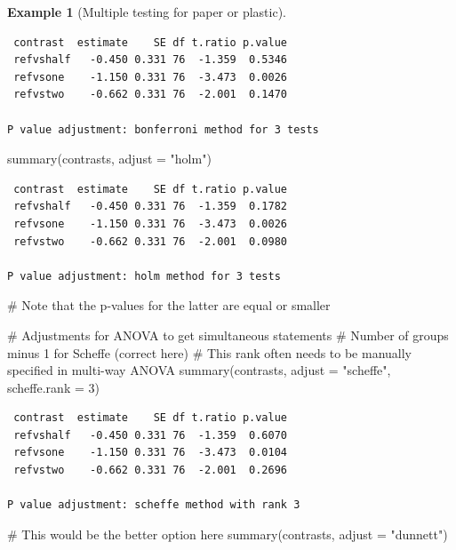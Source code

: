 \documentclass[
  11pt,
  letterpaper,
]{scrbook}
\newenvironment{Shaded}{\begin{snugshade}}{\end{snugshade}}
\newcommand{\AttributeTok}[1]{\textcolor[rgb]{0.40,0.45,0.13}{#1}}
\newcommand{\CommentTok}[1]{\textcolor[rgb]{0.37,0.37,0.37}{#1}}
\newcommand{\DecValTok}[1]{\textcolor[rgb]{0.68,0.00,0.00}{#1}}
\newcommand{\FunctionTok}[1]{\textcolor[rgb]{0.28,0.35,0.67}{#1}}
\newcommand{\NormalTok}[1]{\textcolor[rgb]{0.00,0.23,0.31}{#1}}
\newcommand{\StringTok}[1]{\textcolor[rgb]{0.13,0.47,0.30}{#1}}
\theoremstyle{definition}
\newtheorem{example}{Example}[chapter]
\theoremstyle{remark}
\begin{document}
\begin{example}[Multiple testing for paper or
plastic]
\begin{verbatim}
 contrast  estimate    SE df t.ratio p.value
 refvshalf   -0.450 0.331 76  -1.359  0.5346
 refvsone    -1.150 0.331 76  -3.473  0.0026
 refvstwo    -0.662 0.331 76  -2.001  0.1470

P value adjustment: bonferroni method for 3 tests 
\end{verbatim}

\begin{Shaded}
\begin{Highlighting}[]
\FunctionTok{summary}\NormalTok{(contrasts, }\AttributeTok{adjust =} \StringTok{"holm"}\NormalTok{)}
\end{Highlighting}
\end{Shaded}

\begin{verbatim}
 contrast  estimate    SE df t.ratio p.value
 refvshalf   -0.450 0.331 76  -1.359  0.1782
 refvsone    -1.150 0.331 76  -3.473  0.0026
 refvstwo    -0.662 0.331 76  -2.001  0.0980

P value adjustment: holm method for 3 tests 
\end{verbatim}

\begin{Shaded}
\begin{Highlighting}[]
\CommentTok{\# Note that the p{-}values for the latter are equal or smaller}

\CommentTok{\# Adjustments for ANOVA to get simultaneous statements}
\CommentTok{\# Number of groups minus 1 for Scheffe (correct here)}
\CommentTok{\# This \textquotesingle{}rank\textquotesingle{} often needs to be manually specified in multi{-}way ANOVA}
\FunctionTok{summary}\NormalTok{(contrasts, }\AttributeTok{adjust =} \StringTok{"scheffe"}\NormalTok{, }\AttributeTok{scheffe.rank =} \DecValTok{3}\NormalTok{)}
\end{Highlighting}
\end{Shaded}

\begin{verbatim}
 contrast  estimate    SE df t.ratio p.value
 refvshalf   -0.450 0.331 76  -1.359  0.6070
 refvsone    -1.150 0.331 76  -3.473  0.0104
 refvstwo    -0.662 0.331 76  -2.001  0.2696

P value adjustment: scheffe method with rank 3 
\end{verbatim}

\begin{Shaded}
\begin{Highlighting}[]
\CommentTok{\# This would be the better option here}
\FunctionTok{summary}\NormalTok{(contrasts, }\AttributeTok{adjust =} \StringTok{"dunnett"}\NormalTok{)}
\end{Highlighting}
\end{Shaded}


\end{example}
\end{document}
